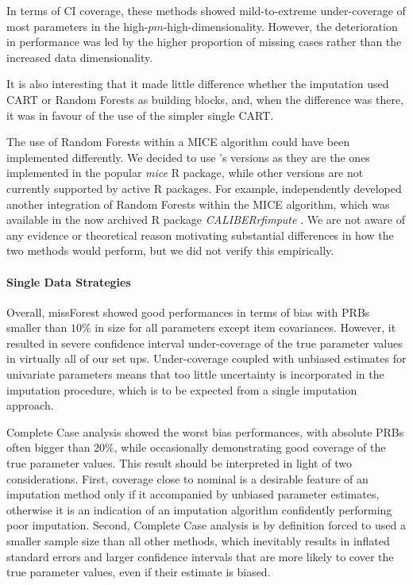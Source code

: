 	In terms of CI coverage, these methods showed mild-to-extreme under-coverage of most parameters in 
	the high-$pm$-high-dimensionality.
	However, the deterioration in performance was led by the higher proportion of missing cases rather than 
	the increased data dimensionality.

	It is also interesting that it made little difference whether the imputation used CART or Random Forests 
	as building blocks, and, when the difference was there, it was in favour of the use of the simpler single CART.
	
	The use of Random Forests within a MICE algorithm could have been implemented differently.
	We decided to use \cite{dooveEtAl:2014}'s versions as they are the ones implemented in the popular 
	\emph{mice} R package, while other versions are not currently supported by active R packages.
	For example, \cite{shahEtAl:2014} independently developed another integration of Random Forests
	within the MICE algorithm, which was available in the now archived R package \emph{CALIBERrfimpute}
	\citep{CALIBERrfimpute}.
	We are not aware of any evidence or theoretical reason motivating substantial differences in how 
	the two methods would perform, but we did not verify this empirically.

\paragraph{Single Data Strategies}
	Overall, missForest showed good performances in terms of bias with PRBs smaller than $10\%$ in size for
	all parameters except item covariances.
	However, it resulted in severe confidence interval under-coverage of the true parameter values in virtually 
	all of our set ups.
	Under-coverage coupled with unbiased estimates for univariate parameters means that too little uncertainty 
	is incorporated in the imputation procedure, which is to be expected from a single imputation approach.

	Complete Case analysis showed the worst bias performances, with absolute PRBs often bigger than 20\%, 
	while occasionally demonstrating good coverage of the true parameter values.
	This result should be interpreted in light of two considerations.
	First, coverage close to nominal is a desirable feature of an imputation method only if it accompanied by 
	unbiased parameter estimates, otherwise it is an indication of an imputation algorithm confidently 
	performing poor imputation.
	Second, Complete Case analysis is by definition forced to used a smaller sample size than all other methods,
	which inevitably results in inflated standard errors and larger confidence intervals that are more likely to 
	cover the true parameter values, even if their estimate is biased.


